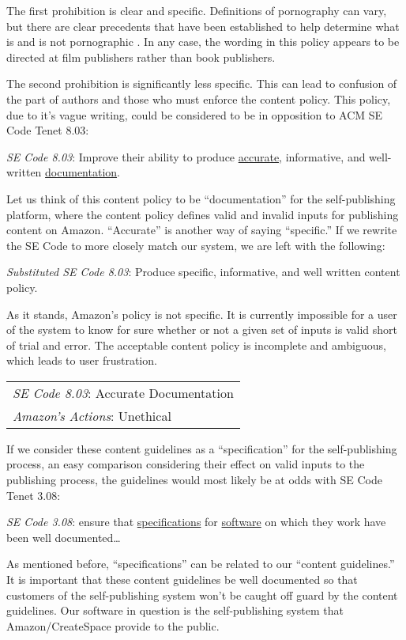 \documentclass[11pt]{article}
\begin{document}
\begin{multicols}{2}
\begin{itemize}
\end{itemize}

The first prohibition is clear and specific.  Definitions of pornography can vary, but there are clear precedents that have been established to help determine what is and is not pornographic \cite{MillerVsCA}.  In any case, the wording in this policy appears to be directed at film publishers rather than book publishers.

The second prohibition is significantly less specific. This can lead to confusion of the part of authors and those who must enforce the content policy.  This policy, due to it's vague writing, could be considered to be in opposition to ACM SE Code Tenet 8.03:

\emph{SE Code 8.03}: Improve their ability to produce \underline{accurate}, informative, and well-written \underline{documentation}. 

Let us think of this content policy to be ``documentation'' for the self-publishing platform, where the content policy defines valid and invalid inputs for publishing content on Amazon.  ``Accurate'' is another way of saying ``specific.''  If we rewrite the SE Code to more closely match our system, we are left with the following:

\emph{Substituted SE Code 8.03}: Produce specific, informative, and well written content policy.

As it stands, Amazon's policy is not specific.  It is currently impossible for a user of the system to know for sure whether or not a given set of inputs is valid short of trial and error.  The acceptable content policy is incomplete and ambiguous, which leads to user frustration.

\begin{tabular}{| l |}
\hline
\emph{SE Code 8.03}: Accurate Documentation \\
\emph{Amazon's Actions}: Unethical \\
\hline
\end{tabular}

If we consider these content guidelines as a ``specification'' for the self-publishing process, an easy comparison considering their effect on valid inputs to the publishing process, the guidelines would most likely be at odds with SE Code Tenet 3.08:

\emph{SE Code 3.08}: ensure that \underline{specifications} for \underline{software} on which they work have been well documented\ldots 


As mentioned before, ``specifications'' can be related to our ``content guidelines.''  It is important that these content guidelines be well documented so that customers of the self-publishing system won't be caught off guard by the content guidelines.  Our software in question is the self-publishing system that Amazon/CreateSpace provide to the public.


\end{multicols}
\end{document}
